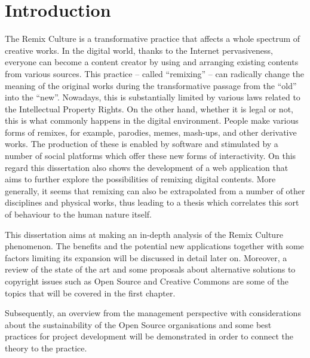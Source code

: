 \chapter*{Introduction}
\label{ch:introduction}


The Remix Culture is a transformative practice that affects a whole spectrum of creative works. In the digital world, thanks to the Internet pervasiveness, everyone can become a content creator by using and arranging existing contents from various sources. This practice – called “remixing” – can radically change the meaning of the original works during the transformative passage from the “old” into the “new”. Nowadays, this is substantially limited by various laws related to the Intellectual Property Rights. On the other hand, whether it is legal or not, this is what commonly happens in the digital environment. People make various forms of remixes, for example, parodies, memes, mash-ups, and other derivative works. The production of these is enabled by software and stimulated by a number of social platforms which offer these new forms of interactivity. On this regard this dissertation also shows the development of a web application that aims to further explore the possibilities of remixing digital contents. More generally, it seems that remixing can also be extrapolated from a number of other disciplines and physical works, thus leading to a thesis which correlates this sort of behaviour to the human nature itself.

This dissertation aims at making an in-depth analysis of the Remix Culture phenomenon. The benefits and the potential new applications together with some factors limiting its expansion will be discussed in detail later on. Moreover, a review of the state of the art and some proposals about alternative solutions to copyright issues such as Open Source and Creative Commons are some of the topics that will be covered in the first chapter.

Subsequently, an overview from the management perspective with considerations about the sustainability of the Open Source organisations and some best practices for project development will be demonstrated in order to connect the theory to the practice.

